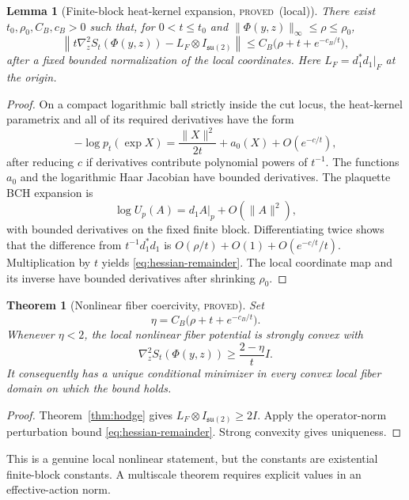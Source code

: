\documentclass[11pt]{article}
\newcommand{\proved}{\textcolor{provedgreen}{\textsc{proved}}}
\newcommand{\su}{\mathfrak{su}(2)}
\newtheorem{theorem}[definition]{Theorem}
\newtheorem{lemma}[definition]{Lemma}
\theoremstyle{remark}
\begin{document}
\begin{lemma}[Finite-block heat-kernel expansion, \proved\ (local)]\label{lem:hk}
There exist $t_0,\rho_0,C_B,c_B>0$ such that, for
$0<t\le t_0$ and $\|\Phi(y,z)\|_\infty\le\rho\le\rho_0$,
\begin{equation}\label{eq:hessian-remainder}
 \left\|t\nabla_z^2S_t(\Phi(y,z))-L_F\otimes I_{\su}\right\|
 \le C_B\bigl(\rho+t+e^{-c_B/t}\bigr),
\end{equation}
after a fixed bounded normalization of the local coordinates.  Here
$L_F=d_1^*d_1|_F$ at the origin.
\end{lemma}
\begin{proof}
On a compact logarithmic ball strictly inside the cut locus, the heat-kernel
parametrix and all of its required derivatives have the form
\[
 -\log p_t(\exp X)=\frac{\|X\|^2}{2t}+a_0(X)+O(e^{-c/t}),
\]
after reducing $c$ if derivatives contribute polynomial powers of $t^{-1}$.
The functions $a_0$ and the logarithmic Haar Jacobian have bounded derivatives.
The plaquette BCH expansion is
\[
 \log U_p(A)=d_1A|_p+O(\|A\|^2),
\]
with bounded derivatives on the fixed finite block.  Differentiating twice
shows that the difference from $t^{-1}d_1^*d_1$ is
$O(\rho/t)+O(1)+O(e^{-c/t}/t)$.  Multiplication by $t$ yields
\eqref{eq:hessian-remainder}.  The local coordinate map and its inverse have
bounded derivatives after shrinking $\rho_0$.
\end{proof}

\begin{theorem}[Nonlinear fiber coercivity, \proved]\label{thm:nonlinear}
Set
\[
 \eta=C_B\bigl(\rho+t+e^{-c_B/t}\bigr).
\]
Whenever $\eta<2$, the local nonlinear fiber potential is strongly convex
with
\begin{equation}\label{eq:alpha}
 \nabla_z^2S_t(\Phi(y,z))\ge\frac{2-\eta}{t}I.
\end{equation}
It consequently has a unique conditional minimizer in every convex local
fiber domain on which the bound holds.
\end{theorem}
\begin{proof}
Theorem~\ref{thm:hodge} gives
$L_F\otimes I_{\su}\ge2I$.  Apply the operator-norm perturbation bound
\eqref{eq:hessian-remainder}.  Strong convexity gives uniqueness.
\end{proof}

This is a genuine local nonlinear statement, but the constants are
existential finite-block constants.  A multiscale theorem requires explicit
values in an effective-action norm.
\end{document}
